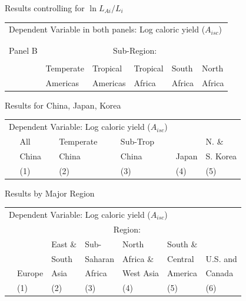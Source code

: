 \documentclass[10pt, xcolor=dvipsnames]{beamer}
\begin{document}
\begin{frame}{Results controlling for $\ln L_{Ai}/L_i$}

{\scriptsize
\begin{tabularx}{\textwidth}{lXXXXX}
\midrule
\multicolumn{6}{l}{Dependent Variable in both panels: Log caloric yield ($A_{isc}$)} \\ \\
\\
Panel B & \multicolumn{5}{c}{Sub-Region:} \\ \cmidrule{2-6}
 &           &   &           &          &             \\
 & Temperate & Tropical  & Tropical & South    & North    \\
 & Americas  & Americas  & Africa   & Africa   & Africa     \\
\midrule

\midrule
\end{tabularx}
}
\end{frame}

\begin{frame}{Results for China, Japan, Korea}\label{chinareg}

{\scriptsize
\begin{tabularx}{\textwidth}{lXXXXX}
\midrule
\multicolumn{4}{l}{Dependent Variable: Log caloric yield ($A_{isc}$)} \\
 & All& Temperate & Sub-Trop & & N. \& \\
 & China & China  & China & Japan & S. Korea  \\
 & (1) & (2) & (3) & (4) & (5) \\
\midrule

\midrule
\end{tabularx}
}

\hfill \hyperlink{china}{}
\end{frame}

\begin{frame}{Results by Major Region}\label{regiontab}

{\scriptsize
\begin{tabularx}{\textwidth}{lXXXXXX}
\midrule
\multicolumn{7}{l}{Dependent Variable: Log caloric yield ($A_{isc}$)} \\
 & \multicolumn{6}{c}{Region:} \\ \cmidrule{2-7}
 &        & East \& & Sub-        & North     & South \&  &  \\
 &        & South   & Saharan     & Africa \& & Central   & U.S. and \\
 & Europe & Asia    & Africa      & West Asia & America   & Canada \\
 & (1) & (2) & (3) & (4) & (5) & (6) \\
\midrule

\midrule
\end{tabularx}
}

\hfill \hyperlink{region}{}
\end{frame}
\end{document}
